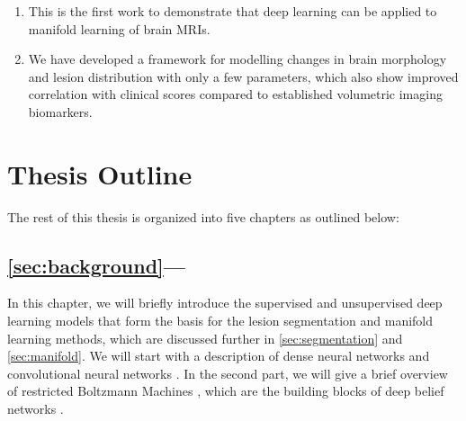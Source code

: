 \begin{enumerate}

\item This is the first work to demonstrate that deep learning can be applied to
manifold learning of brain MRIs.

\item We have developed a framework for modelling changes in brain morphology
and lesion distribution with only a few parameters, which also show improved
correlation with clinical scores compared to established volumetric imaging
biomarkers.

\end{enumerate}

\section[Thesis outline]{Thesis Outline}

The rest of this thesis is organized into five chapters as outlined below:

\subsection*{\ref{sec:background}---}

In this chapter, we will briefly introduce the supervised and unsupervised deep
learning models that form the basis for the lesion segmentation and manifold
learning methods, which are discussed further in \ref{sec:segmentation}
and \ref{sec:manifold}. We will start with a description of dense neural
networks \citep{farley1954,werbos1974,rumelhart1986} and convolutional
neural networks \citep{fukushima1980,lecun1989,lecun1998}. In the second
part, we will give a brief overview of restricted Boltzmann Machines
\citep{freund1992,hinton2010a}, which are the building blocks of deep belief
networks \citep{hinton2006b}.

